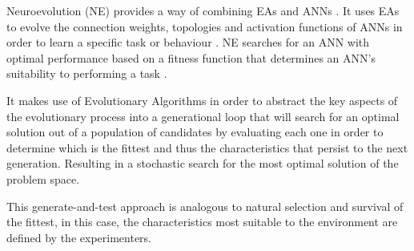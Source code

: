


Neuroevolution (NE) provides a way of combining EAs and ANNs \cite{RefWorks:31}. It uses EAs to evolve the connection weights, topologies and activation functions of ANNs in order to learn a specific task or behaviour \cite{gomez1999solving}. NE searches for an ANN with optimal performance based on a fitness function that determines an ANN's suitability to performing a task \cite{RefWorks:31}.



It makes use of Evolutionary Algorithms in order to abstract the key aspects of the evolutionary process into a generational loop that will search for an optimal solution out of a population of candidates by evaluating each one in order to determine which is the fittest and thus the characteristics that persist to the next generation. Resulting in a stochastic search for the most optimal solution of the problem space.

This generate-and-test approach is analogous to natural selection and survival of the fittest, in this case, the characteristics most suitable to the environment are defined by the experimenters.

